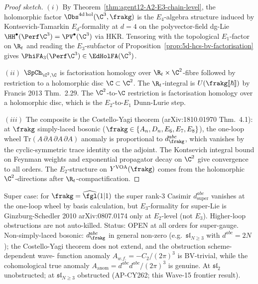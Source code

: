 \begin{proof}[Proof sketch]
$(i)$ By Theorem~\ref{thm:agent12-A2-E3-chain-level}, the holomorphic
factor $\Obs^{4\mathrm{d\,hol}}(\C^3, \frakg)$ is the $E_4$-algebra
structure induced by Kontsevich-Tamarkin $E_d$-formality at $d = 4$ on
the polyvector-field dg-Lie $\HH^\bullet(\Perf \C^3) = \PV^\bullet(\C^3)$
via HKR. Tensoring with the topological $E_1$-factor on $\R_t$ and
reading the $E_3$-subfactor of Proposition~\ref{prop:5d-hcs-bv-factorisation}
gives $\PhiFA_3(\Perf \C^3) \in \EdHolFA(\C^3)$.

$(ii)$ $\SpCh_{\C^2, \C}$ is factorisation homology over
$\R_t \times \C^2$-fibre followed by restriction to a holomorphic
disc $\C \subset \C^2$. The $\R_t$-integral is $U(\frakg[\![\hbar]\!])$
by Francis 2013 Thm.~2.29. The $\C^2$-to-$\C$ restriction is
factorisation homology over a holomorphic disc, which is the
$E_2$-to-$E_1$ Dunn-Lurie step.

$(iii)$ The composite is the Costello-Yagi theorem
(arXiv:1810.01970 Thm.~4.1): at $\frakg$ simply-laced bosonic
($\frakg \in \{A_n, D_n, E_6, E_7, E_8\}$), the one-loop wheel
$\mathrm{Tr}(A\,\partial A\,\partial A\,\partial A)$ anomaly is
proportional to $d^{abc}_\frakg$, which vanishes by the cyclic-symmetric
trace identity on the adjoint. The Kontsevich integral bound on Feynman
weights and exponential propagator decay on $\C^2$ give convergence
to all orders. The $E_2$-structure on $Y^{\mathrm{VOA}}(\frakg)$ comes
from the holomorphic $\C^2$-directions after $\R_t$-compactification.
\end{proof}

\begin{remark}
\label{rem:agent12-non-simply-laced-super}
Super case: for $\frakg = \widehat{\fgl}(1|1)$ the super rank-3 Casimir
$d^{abc}_{\mathrm{super}}$ vanishes at the one-loop wheel by basis
calculation, but $E_3$-formality for super-Lie is Ginzburg-Schedler 2010
arXiv:0807.0174 only at $E_2$-level (not $E_3$). Higher-loop obstructions
are not auto-killed. Status: OPEN at all orders for super-gauge.
Non-simply-laced bosonic: $d^{abc}_\frakg$ in general non-zero (e.g.\
$\mathfrak{sl}_{N\geq 3}$ with $d^{abc} = 2N$); the Costello-Yagi
theorem does not extend, and the obstruction scheme-dependent wave-
function anomaly $A_{w.f.} = -C_2/(2\pi)^3$ is BV-trivial, while the
cohomological true anomaly $A_{\mathrm{anom}} = d^{abc}d^{abc}/(2\pi)^3$
is genuine. At $\mathfrak{sl}_2$ unobstructed; at $\mathfrak{sl}_{N\geq 3}$
obstructed (AP-CY262; this Wave-15 frontier result).
\end{remark}

